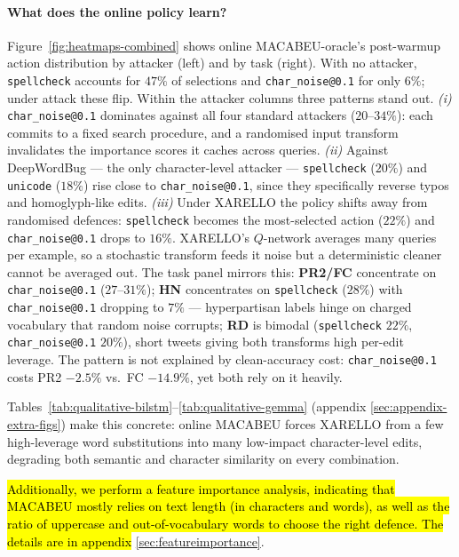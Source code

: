 \documentclass[11pt]{article}
\begin{document}
\paragraph{What does the online policy learn?}
Figure~\ref{fig:heatmaps-combined} shows online MACABEU-oracle's post-warmup action distribution by attacker (left) and by task (right). With no attacker, \texttt{spellcheck} accounts for $47\%$ of selections and \texttt{char\_noise@0.1} for only $6\%$; under attack these flip. Within the attacker columns three patterns stand out. \emph{(i)} \texttt{char\_noise@0.1} dominates against all four standard attackers ($20$--$34\%$): each commits to a fixed search procedure, and a randomised input transform invalidates the importance scores it caches across queries. \emph{(ii)} Against DeepWordBug --- the only character-level attacker --- \texttt{spellcheck} ($20\%$) and \texttt{unicode} ($18\%$) rise close to \texttt{char\_noise@0.1}, since they specifically reverse typos and homoglyph-like edits. \emph{(iii)} Under XARELLO the policy shifts away from randomised defences: \texttt{spellcheck} becomes the most-selected action ($22\%$) and \texttt{char\_noise@0.1} drops to $16\%$. XARELLO's $Q$-network averages many queries per example, so a stochastic transform feeds it noise but a deterministic cleaner cannot be averaged out. The task panel mirrors this: \textbf{PR2/FC} concentrate on \texttt{char\_noise@0.1} ($27$--$31\%$); \textbf{HN} concentrates on \texttt{spellcheck} ($28\%$) with \texttt{char\_noise@0.1} dropping to $7\%$ --- hyperpartisan labels hinge on charged vocabulary that random noise corrupts; \textbf{RD} is bimodal (\texttt{spellcheck} $22\%$, \texttt{char\_noise@0.1} $20\%$), short tweets giving both transforms high per-edit leverage. The pattern is not explained by clean-accuracy cost: \texttt{char\_noise@0.1} costs PR2 $-2.5\%$ vs.\ FC $-14.9\%$, yet both rely on it heavily.

Tables~\ref{tab:qualitative-bilstm}--\ref{tab:qualitative-gemma} (appendix \ref{sec:appendix-extra-figs}) make this concrete: online MACABEU forces XARELLO from a few high-leverage word substitutions into many low-impact character-level edits, degrading both semantic and character similarity on every combination.

\hl{Additionally, we perform a feature importance analysis, indicating that MACABEU mostly relies on text length (in characters and words), as well as the ratio of uppercase and out-of-vocabulary words to choose the right defence. The details are in appendix} \ref{sec:featureimportance}. 
\end{document}
